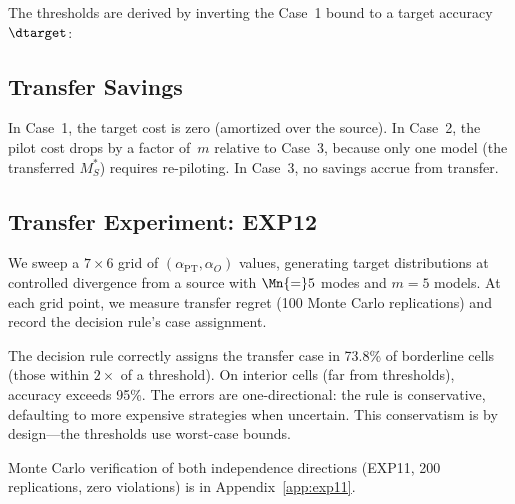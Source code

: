 The thresholds are derived by inverting the Case~1 bound to a target
accuracy~$\dtarget$:

\bigskip
\noindent{}
\bigskip

\subsection{Transfer Savings}

\begin{proposition}
\label{prop:transfer-savings}
In Case~1, the target cost is zero (amortized over the source).
In Case~2, the pilot cost drops by a factor of~$m$ relative to
Case~3, because only one model (the transferred $M_S^*$) requires
re-piloting.  In Case~3, no savings accrue from transfer.
\end{proposition}

\subsection{Transfer Experiment: EXP12}
\label{sec:exp12}

We sweep a $7 \times 6$ grid of
$(\alpha_{\mathrm{PT}}, \alpha_O)$ values,
generating target distributions at controlled divergence from a source
with $\Mn{=}5$ modes and $m{=}5$ models.  At each grid point, we measure
transfer regret (100 Monte Carlo replications) and record the decision
rule's case assignment.

The decision rule correctly assigns the transfer case in 73.8\% of
borderline cells (those within $2\times$ of a threshold).
On interior cells (far from thresholds), accuracy exceeds 95\%.
The errors are one-directional: the rule is conservative, defaulting to
more expensive strategies when uncertain.  This conservatism is by
design---the thresholds use worst-case bounds.

Monte Carlo verification of both independence directions (EXP11, 200 replications, zero violations) is in Appendix~\ref{app:exp11}.
